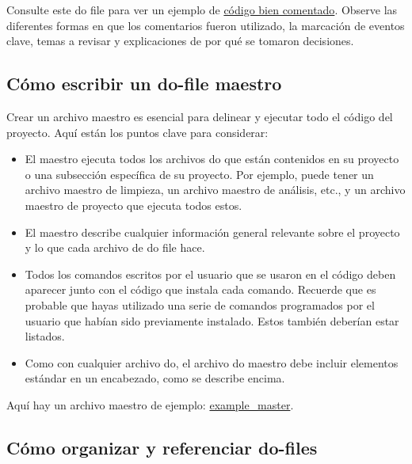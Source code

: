 \documentclass[11pt,en]{elegantpaper}
\begin{document}
Consulte este do file para ver un ejemplo de \href{http://www.poverty-action.org/research-transparency/example-code-comments}{código bien comentado}. Observe las diferentes formas en que los comentarios fueron utilizado, la marcación de eventos clave, temas a revisar y explicaciones de por qué se tomaron decisiones.

\subsection{Cómo escribir un do-file maestro}
\label{sec:domaestro}

Crear un archivo maestro es esencial para delinear y ejecutar todo el código del proyecto. Aquí están los puntos clave para
considerar:

        \begin{itemize}
		\item El maestro ejecuta todos los archivos do que están contenidos en su proyecto o una subsección específica de su 	 		       proyecto. Por ejemplo, puede tener un archivo maestro de limpieza, un archivo maestro de análisis, etc., y un 	  		        archivo maestro de proyecto que ejecuta todos estos.
		\item El maestro describe cualquier información general relevante sobre el proyecto y lo que cada archivo de do file                           hace.
		\item Todos los comandos escritos por el usuario que se usaron en el código deben aparecer junto con el código que 	 		       instala cada comando. Recuerde que es probable que hayas utilizado una serie de comandos programados por el                             usuario que habían sido previamente instalado. Estos también deberían estar listados.
		\item Como con cualquier archivo do, el archivo do maestro debe incluir elementos estándar en un encabezado, como se 			      describe encima.
	\end{itemize}

Aquí hay un archivo maestro de ejemplo: \href{http://www.poverty-action.org/research-transparency/example-master}{example_master}.

\subsection{Cómo organizar y referenciar do-files}
\label{sec:doorganizar}
\end{document}

